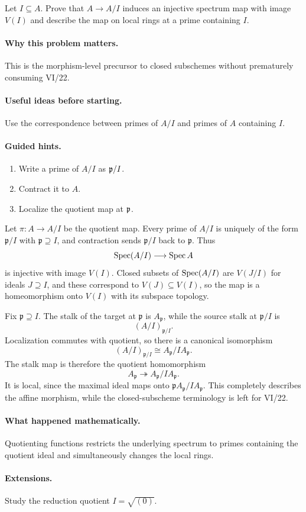 \begin{problem}\label{prob:vi19-p08}
Let $I\subseteq A$. Prove that $A\to A/I$ induces an injective spectrum map with image $V(I)$ and describe the map on local rings at a prime containing $I$.
\end{problem}

\ifdefined\FullProblemDossiers
\paragraph{Why this problem matters.}
This is the morphism-level precursor to closed subschemes without prematurely consuming VI/22.

\paragraph{Useful ideas before starting.}
Use the correspondence between primes of $A/I$ and primes of $A$ containing $I$.

\paragraph{Guided hints.}
\begin{enumerate}
\item Write a prime of $A/I$ as $\mathfrak p/I$.
\item Contract it to $A$.
\item Localize the quotient map at $\mathfrak p$.
\end{enumerate}

\begin{solution}
Let \(\pi:A\to A/I\) be the quotient map.  Every prime of \(A/I\) is uniquely of the form \(\mathfrak p/I\) with \(\mathfrak p\supseteq I\), and contraction sends \(\mathfrak p/I\) back to \(\mathfrak p\).  Thus
\[
\operatorname{Spec}(A/I)\longrightarrow\operatorname{Spec} A
\]
is injective with image \(V(I)\).  Closed subsets of \(\operatorname{Spec}(A/I)\) are \(V(J/I)\) for ideals \(J\supseteq I\), and these correspond to \(V(J)\subseteq V(I)\), so the map is a homeomorphism onto \(V(I)\) with its subspace topology.

Fix \(\mathfrak p\supseteq I\).  The stalk of the target at \(\mathfrak p\) is \(A_{\mathfrak p}\), while the source stalk at \(\mathfrak p/I\) is
\[
(A/I)_{\mathfrak p/I}.
\]
Localization commutes with quotient, so there is a canonical isomorphism
\[
(A/I)_{\mathfrak p/I}\cong A_{\mathfrak p}/IA_{\mathfrak p}.
\]
The stalk map is therefore the quotient homomorphism
\[
A_{\mathfrak p}\twoheadrightarrow A_{\mathfrak p}/IA_{\mathfrak p}.
\]
It is local, since the maximal ideal maps onto \(\mathfrak pA_{\mathfrak p}/IA_{\mathfrak p}\).  This completely describes the affine morphism, while the closed-subscheme terminology is left for VI/22.
\end{solution}

\paragraph{What happened mathematically.}
Quotienting functions restricts the underlying spectrum to primes containing the quotient ideal and simultaneously changes the local rings.

\paragraph{Extensions.}
Study the reduction quotient $I=\sqrt{(0)}$.
\fi
